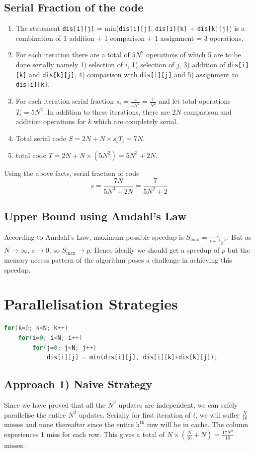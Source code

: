 \documentclass{article}
\begin{document}
\subsection{Serial Fraction of the code}
\begin{enumerate}
    \item The statement \texttt{dis[i][j]} = min(\texttt{dis[i][j]}, \texttt{dis[i][k]} + \texttt{dis[k][j]}) is a combination of 1 addition + 1 comparison + 1 assignment = 3 operations. 
    \item For each iteration there are a total of $5N^2$ operations of which 5 are to be done serially namely 1) selection of $i$, 1) selection of $j$, 3) addition of \texttt{dis[i][k]} and \texttt{dis[k][j]}, 4) comparison with \texttt{dis[i][j]} and 5) assignment to \texttt{dis[i][k]}.
    \item For each iteration serial fraction $s_i = \frac{5}{5N^2} = \frac{1}{N^2}$ and let total operations $T_i = 5N^2$. In addition to these iterations, there are $2N$ comparison and addition operations for $k$ which are completely serial. 
    \item Total serial code $S = 2N + N \times s_{i}T_{i} = 7N$.
    \item total code $T = 2N + N \times (5N^2) = 5N^3 + 2N$. 
\end{enumerate}

Using the above facts, serial fraction of code
$$s = \frac{7N}{5N^3+2N} = \frac{7}{5N^2+2}$$ 

\subsection{Upper Bound using Amdahl's Law}
According to Amdahl's Law, maximum possible speedup is 
$S_{\mathrm{max}} = \frac{1}{s+\frac{1-s}{p}}$.
But as $N \to \infty$, $s \to 0$, so $S_{\mathrm{max}} \to p$.
Hence ideally we should get a speedup of $p$ but the memory access pattern of the algorithm poses a challenge in achieving this speedup.

\section{Parallelisation Strategies}
\begin{lstlisting}[language=C, caption=Core Algorithm]
for(k=0; k<N; k++)
    for(i=0; i<N; i++)
        for(j=0; j<N; j++)
            dis[i][j] = min(dis[i][j], dis[i][k]+dis[k][j]);
\end{lstlisting}
\subsection{Approach 1) Naive Strategy}
Since we have proved that all the $N^2$ updates are independent, we can safely parallelise the entire $N^2$ updates. Serially for first iteration of $i$, we will suffer $\frac{N}{16}$ misses and none thereafter since the entire $\mathrm{k}^{\mathrm{th}}$ row will be in cache. The column experiences 1 miss for each row. This gives a total of $N \times (\frac{N}{16} + N) = \frac{17N^2}{16}$ misses.
\end{document}
